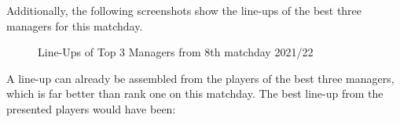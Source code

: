 \clearpage Additionally, the following screenshots show the line-ups of the best three managers for this matchday. 

\begin{figure}[htp]
    \captionsetup{justification=centering}
    \caption{Line-Ups of Top 3 Managers from 8th matchday 2021/22}
    \label{fig:top-3}
\end{figure}

A line-up can already be assembled from the players of the best three managers, which is far better than rank one on this matchday. The best line-up from the presented players would have been:

